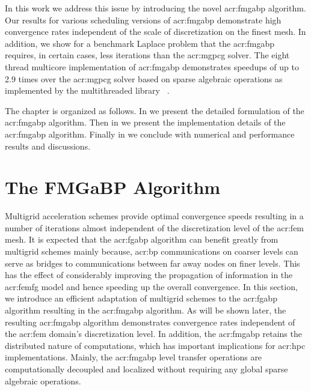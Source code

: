 In this work we address this issue by introducing the novel \gls{acr:fmgabp} algorithm.
Our results for various scheduling versions of \gls{acr:fmgabp} demonstrate high convergence rates independent of the scale of discretization on the finest mesh.
In addition, we show for a benchmark Laplace problem that the \gls{acr:fmgabp} requires, in certain cases, less iterations than the \gls{acr:mgpcg} solver.
The eight thread multicore implementation of \gls{acr:fmgabp} demonstrates speedups of up to 2.9 times over the \gls{acr:mgpcg} solver based on sparse algebraic operations as implemented by the multithreaded library ~\cite{bib:dealii2007}.


The chapter is organized as follows.
In  we present the detailed formulation of the \gls{acr:fmgabp} algorithm.
Then in  we present the implementation details of the \gls{acr:fmgabp} algorithm.
Finally in  we conclude with numerical and performance results and discussions.


\section{The FMGaBP Algorithm}
\label{sec:fmgabp}

Multigrid acceleration schemes \cite{bib:Trottenberg2001M,bib:Briggs2000AMT} provide optimal convergence speeds resulting in a number of iterations almost independent of the discretization level of the \gls{acr:fem} mesh.
It is expected that the \gls{acr:fgabp} algorithm can benefit greatly from multigrid schemes mainly because, \gls{acr:bp} communications on coarser levels can serve as bridges to communications between far away nodes on finer levels.
This has the effect of considerably improving the propagation of information in the \gls{acr:femfg} model and hence speeding up the overall convergence.
In this section, we introduce an efficient adaptation of multigrid schemes to the \gls{acr:fgabp} algorithm resulting in the \gls{acr:fmgabp} algorithm.
As will be shown later, the resulting \gls{acr:fmgabp} algorithm demonstrates convergence rates independent of the \gls{acr:fem} domain's discretization level.
In addition, the \gls{acr:fmgabp} retains the distributed nature of computations, which has important implications for \gls{acr:hpc} implementations. 
Mainly, the \gls{acr:fmgabp} level transfer operations are computationally decoupled and localized without requiring any global sparse algebraic operations.


